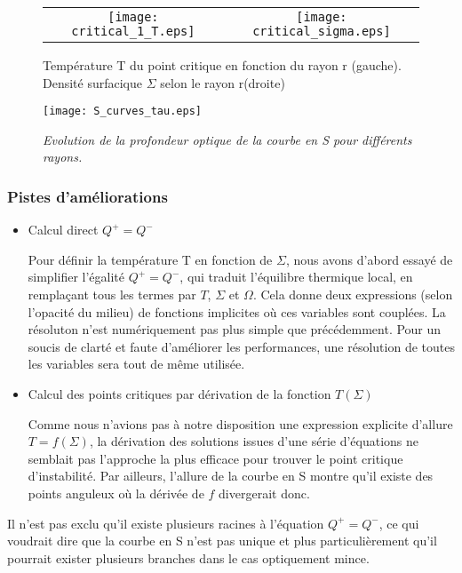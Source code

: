 \begin{figure}[htb!]
\centering
\begin{tabular}{cc} 
\texttt{[image: critical\_1\_T.eps]} &
\texttt{[image: critical\_sigma.eps]} \\
\end{tabular}
  \caption{Température T du point critique en fonction du rayon r (gauche). Densité surfacique $\Sigma$ selon le rayon r(droite)}
\label{Fig::fctR}
\end{figure}
  

\begin{figure}[htb!]
	\centering
	\texttt{[image: S\_curves\_tau.eps]}
	\caption{\textit{Evolution de la profondeur optique de la courbe en S pour différents rayons.}  }
	\label{Fig::3}
\end{figure}

\subsubsection{Pistes d'améliorations}
\label{sec::pistes}
\begin{itemize}

\item Calcul direct $Q^+ = Q^-$

Pour définir la température T en fonction de $\Sigma$, nous avons d'abord essayé de simplifier l'égalité $Q^+ = Q^-$, qui traduit l'équilibre thermique local, en remplaçant tous les termes par $T$, $\Sigma$ et $\Omega$. Cela donne deux expressions (selon l'opacité du milieu) de fonctions implicites où ces variables sont couplées.
La résoluton n'est numériquement pas plus simple que précédemment. Pour un soucis de clarté et faute d'améliorer les performances, une résolution de toutes les variables sera tout de même utilisée.

\item Calcul des points critiques par dérivation de la fonction $T(\Sigma)$

Comme nous n'avions pas à notre disposition une expression explicite d'allure $T = f(\Sigma)$, la dérivation des solutions issues d'une série d'équations ne semblait pas l'approche la plus efficace pour trouver le point critique d'instabilité. Par ailleurs, l'allure de la courbe en S montre qu'il existe des points anguleux où la dérivée de $f$ divergerait donc.
\end{itemize}


Il n'est pas exclu qu'il existe plusieurs racines à l'équation $Q^+ = Q^-$, ce qui voudrait dire que la courbe en S n'est pas unique et plus particulièrement qu'il pourrait exister plusieurs branches dans le cas optiquement mince. 


